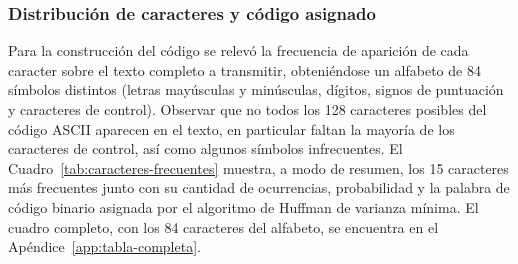 \subsubsection{Distribución de caracteres y código asignado}

Para la construcción del código se relevó la frecuencia de aparición de cada caracter sobre el texto completo a transmitir, obteniéndose un alfabeto de 84 símbolos distintos
(letras mayúsculas y minúsculas, dígitos, signos de puntuación y caracteres de control). Observar que no todos los 128 caracteres posibles del código ASCII aparecen en el texto, en particular faltan la mayoría de los caracteres de control, así como algunos símbolos infrecuentes. El Cuadro~\ref{tab:caracteres-frecuentes} muestra, a modo de resumen, los 15 caracteres más frecuentes junto con su cantidad de ocurrencias, probabilidad y la palabra de código
binario asignada por el algoritmo de Huffman de varianza mínima. El cuadro completo, con los 84 caracteres del alfabeto, se encuentra en el Apéndice~\ref{app:tabla-completa}.

